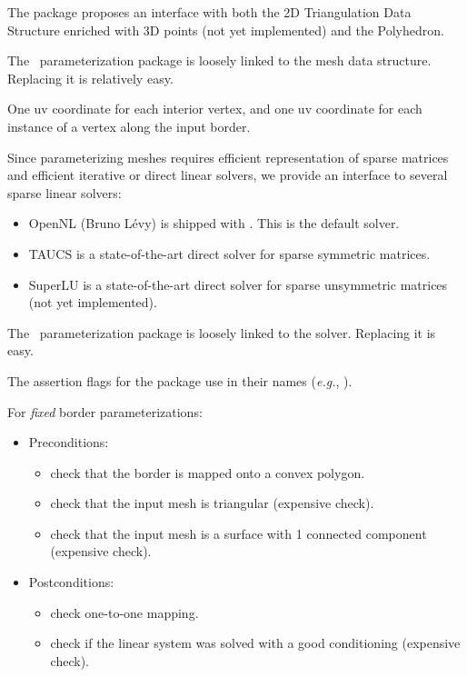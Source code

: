 The package proposes
an interface with both the 2D Triangulation Data Structure enriched
with 3D points (not yet implemented) and the Polyhedron.

The \cgal\ parameterization package is loosely linked to the
mesh data structure. Replacing it is relatively easy.



One uv coordinate for each interior vertex, and one uv coordinate for
each instance of a vertex along the input border.



Since parameterizing meshes requires
efficient representation of sparse matrices and efficient iterative or
direct linear solvers, we provide an interface to several
sparse linear solvers:
\begin{itemize}
\item OpenNL (Bruno L{\'e}vy) is shipped with \cgal. This is the default solver.
\item TAUCS is a state-of-the-art direct solver for sparse symmetric matrices.
\item SuperLU is a state-of-the-art direct solver for sparse unsymmetric matrices (not yet implemented).
\end{itemize}

The \cgal\ parameterization package is loosely linked to the
solver. Replacing it is easy.



The assertion flags for the package
use  in their names (\textit{e.g.},
).

For \emph{fixed} border parameterizations:
\begin{itemize}
\item Preconditions:
    \begin{itemize}
    \item check that the border is mapped onto a convex polygon.
    \item check that the input mesh is triangular (expensive check).
    \item check that the input mesh is a surface with 1 connected component (expensive check).
    \end{itemize}
\item Postconditions:
    \begin{itemize}
    \item check one-to-one mapping.
    \item check if the linear system was solved with a good conditioning (expensive check).
    \end{itemize}
\end{itemize}

